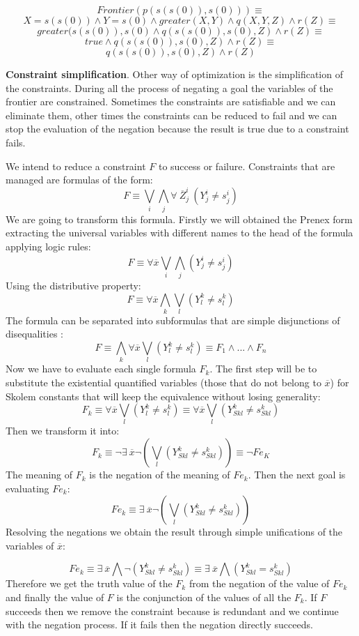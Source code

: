 \documentclass{llncs}
\begin{document}
$$Frontier(p(s(s(0)),s(0))) \equiv $$
$${ X=s(s(0)) \wedge Y=s(0) \wedge greater(X,Y) \wedge q(X,Y,Z) \wedge
  r(Z) } \equiv $$
$${ greater(s(s(0)),s(0) \wedge q(s(s(0)),s(0),Z) \wedge r(Z) } \equiv
$$
$${ true \wedge q(s(s(0)),s(0),Z) \wedge r(Z) } \equiv $$
$${ q(s(s(0)),s(0),Z) \wedge r(Z) } $$

\noindent
{\bf Constraint simplification}. Other way of optimization is the
simplification of the constraints.  During all the process of negating
a goal the variables of the frontier are constrained. Sometimes the
constraints are satisfiable and we can eliminate them, other times
the constraints can be reduced to fail and we can stop the evaluation
of the negation because the result is true due to a constraint fails.
 
We intend to reduce a constraint $F$ to success or failure.
Constraints that are managed are formulas of the form:
\[ F \equiv  \bigvee_i\bigwedge_j \forall~ \overline{Z}_j^i~(Y_j^i \neq s_j^i) \]
We are going to transform this formula. Firstly we will obtained the
Prenex form \cite{Shoenfield} extracting the universal variables with
different names to the head of the formula applying logic rules:
\[ F \equiv \forall \overline{x} \bigvee_i\bigwedge_j (Y_j^i \neq s_j^i) \]
Using the distributive property:
\[ F \equiv \forall \overline{x} \bigwedge_k\bigvee_l (Y_l^k \neq s_l^k) \]
The formula can be separated into subformulas that are simple
disjunctions of disequalities :
\[ F \equiv \bigwedge_k \forall \overline{x} \bigvee_l (Y_l^k \neq s_l^k) \equiv F_1 \wedge ... \wedge F_n\]
Now we have to evaluate each single formula $F_k$. The first step will
be to substitute the existential quantified variables (those that do
not belong to $\overline{x}$) for Skolem constants that will keep the
equivalence without losing generality:
\[ F_k \equiv \forall \overline{x} \bigvee_l ( Y_l^k \neq s_l^k ) \equiv \forall \overline{x} \bigvee_l ( Y_{Sk l}^k \neq s_{Sk l}^k )  \]
Then we transform it into:
\[ F_k \equiv  \neg \exists ~ \overline{x} \neg ( \bigvee_l (Y_{Sk l}^k \neq s_{Sk l}^k) ) \equiv \neg Fe_K \]
The meaning of $F_k$ is the negation of the meaning of $Fe_k$. Then
the next goal is evaluating $Fe_k$:
\[ Fe_k \equiv \exists ~ \overline{x} \neg ( \bigvee_l (Y_{Sk l}^k \neq s_{Sk l}^k)) \] 
Resolving the negations we obtain the result through simple unifications of the variables of $\overline{x}$:

\[ Fe_k  \equiv \exists ~ \overline{x} \bigwedge \neg (Y_{Sk l}^k \neq s_{Sk l}^k)  \equiv \exists ~ \overline{x} \bigwedge (Y_{Sk l}^k = s_{Sk l}^k)  \]
        Therefore we get the truth value of the $F_k$ from the
        negation of the value of $Fe_k$ and finally the value of $F$ is
        the conjunction of the values of all the $F_k$. If $F$
        succeeds then we remove the constraint because is redundant
        and we continue with the negation process. If it fails then
        the negation directly succeeds.
\end{document}
